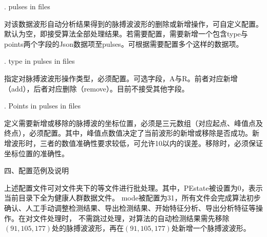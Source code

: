 {. pulses in files

对该数据波形自动分析结果得到的脉搏波波形的删除或新增操作，可自定义配置。默认为空，即接受算法全部处理结果。若需要配置，需要新增一个包含type与points两个字段的Json数据项至pulses。可根据需要配置多个这样的数据项。

. type in pulses in files

指定对脉搏波波形操作类型，必须配置。可选字段，A与R。前者对应新增（add），后者对应删除（remove）。目前不接受其他字段。

. Points in pulses in files

定义需要新增或移除的脉搏波的坐标位置，必须是三元数组（对应起点、峰值点及终点），必须配置。其中，峰值点数值决定了当前波形的新增或移除是否成功。新增波形时，三者的数值准确性要求较低，可允许10以内的误差。移除时，必须保证坐标位置的准确性。

四、配置范例及说明



上述配置文件可对文件夹下的等文件进行批处理。其中，PEstate被设置为0，表示当前目录下全为健康人群数据文件。
mode被配置为31，所有文件会完成算法初步确认、人工手动调整检测结果、导出检测结果、开始特征分析、导出分析特征等操作。在对文件处理时，
不需跳过处理，对算法的自动检测结果需先移除$(91,105,177)$处的脉搏波波形，再在$(91,105,177)$处新增一个脉搏波波形。
}